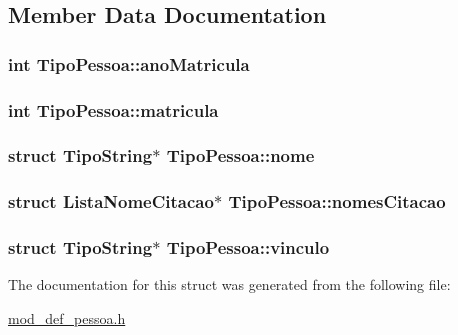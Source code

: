\subsection{Member Data Documentation}
\hypertarget{structTipoPessoa_ab1ef18dcae1d89d53cfa9ec087b7a15e}{
\subsubsection[{ano\+Matricula}]{\setlength{\rightskip}{0pt plus 5cm}int Tipo\+Pessoa\+::ano\+Matricula}}\label{structTipoPessoa_ab1ef18dcae1d89d53cfa9ec087b7a15e}
\hypertarget{structTipoPessoa_abd0ab3d3c3ff7d2fffaf8f162c27df37}{
\subsubsection[{matricula}]{\setlength{\rightskip}{0pt plus 5cm}int Tipo\+Pessoa\+::matricula}}\label{structTipoPessoa_abd0ab3d3c3ff7d2fffaf8f162c27df37}
\hypertarget{structTipoPessoa_ab0c566ddb672088f25083d90bdbc5022}{
\subsubsection[{nome}]{\setlength{\rightskip}{0pt plus 5cm}struct {\bf Tipo\+String}$\ast$ Tipo\+Pessoa\+::nome}}\label{structTipoPessoa_ab0c566ddb672088f25083d90bdbc5022}
\hypertarget{structTipoPessoa_abff4815bccf2680fd20e980a2c83120c}{
\subsubsection[{nomes\+Citacao}]{\setlength{\rightskip}{0pt plus 5cm}struct {\bf Lista\+Nome\+Citacao}$\ast$ Tipo\+Pessoa\+::nomes\+Citacao}}\label{structTipoPessoa_abff4815bccf2680fd20e980a2c83120c}
\hypertarget{structTipoPessoa_a8e3a3d339c06a3408c1febf1d4063a4f}{
\subsubsection[{vinculo}]{\setlength{\rightskip}{0pt plus 5cm}struct {\bf Tipo\+String}$\ast$ Tipo\+Pessoa\+::vinculo}}\label{structTipoPessoa_a8e3a3d339c06a3408c1febf1d4063a4f}


The documentation for this struct was generated from the following file\+:\begin{DoxyCompactItemize}
\item 
\hyperlink{mod__def__pessoa_8h}{mod\+\_\+def\+\_\+pessoa.\+h}\end{DoxyCompactItemize}
